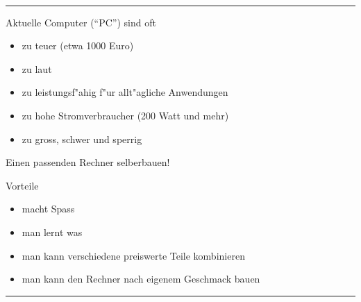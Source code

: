 \documentclass[11pt]{article}
\begin{document}
\begin{minipage}[t]{7cm}
\hfill {\Large{}}\\
\hrule
{}

\bigskip

Aktuelle Computer ("`PC"') sind oft 

\begin{itemize}
\item zu teuer (etwa 1000 Euro)
\item zu laut 
\item zu leistungsf"ahig f"ur allt"agliche Anwendungen
\item zu hohe Stromverbraucher (200 Watt und mehr)
\item zu gross, schwer und sperrig
\end{itemize}

\medskip


\begin{center}
  {\large Einen passenden Rechner selberbauen!}
\end{center}

Vorteile 

\begin{itemize}
\item macht Spass
\item man lernt was
\item man kann verschiedene preiswerte Teile kombinieren
\item man kann den Rechner nach eigenem Geschmack bauen
\end{itemize}



\end{minipage}
\hskip 12mm
\rule[-18.8cm]{0.2pt}{5mm}  %
\hskip 12mm
\end{document}
